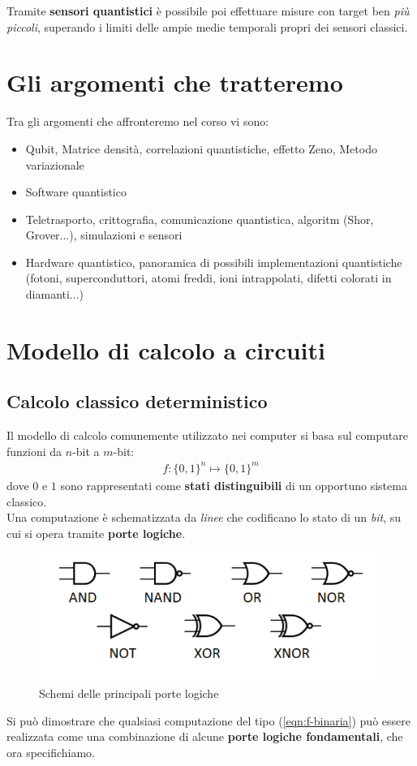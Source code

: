\documentclass[../../InformazioneQuantistica.tex]{subfiles}
\begin{document}
Tramite \textbf{sensori quantistici} è possibile poi effettuare misure con target ben \textit{più piccoli}, superando i limiti delle ampie medie temporali propri dei sensori classici.

\section{Gli argomenti che tratteremo}
Tra gli argomenti che affronteremo nel corso vi sono:
\begin{itemize}
\item Qubit, Matrice densità, correlazioni quantistiche, effetto Zeno, Metodo variazionale
\item Software quantistico
\item Teletrasporto, crittografia, comunicazione quantistica, algoritm (Shor, Grover...), simulazioni e sensori
\item Hardware quantistico, panoramica di possibili implementazioni quantistiche (fotoni, superconduttori, atomi freddi, ioni intrappolati, difetti colorati in diamanti...)
\end{itemize}

\section{Modello di calcolo a circuiti}
\subsection{Calcolo classico deterministico}
Il modello di calcolo comunemente utilizzato nei computer si basa sul computare funzioni da $n$-bit a $m$-bit:
\begin{align}
f: \{0,1\}^n \mapsto \{0,1\}^m
\label{eqn:f-binaria}
\end{align}
dove $0$ e $1$ sono rappresentati come \textbf{stati distinguibili} di un opportuno sistema classico.\\
Una computazione è schematizzata da \textit{linee} che codificano lo stato di un \textit{bit}, su cui si opera tramite \textbf{porte logiche}. 
\begin{figure}[H]
\centering
\includegraphics[scale=0.5]{Immagini/27_2/image001.png}
\caption{Schemi delle principali porte logiche\label{fig:porte-logiche}}
\end{figure}
Si può dimostrare che qualsiasi computazione del tipo (\ref{eqn:f-binaria}) può essere realizzata come una combinazione di alcune \textbf{porte logiche fondamentali}, che ora specifichiamo.\\
\end{document}
